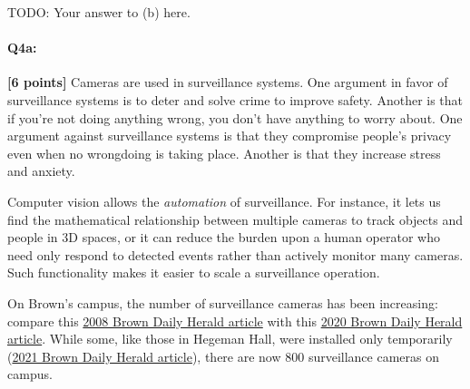 \begin{enumerate}[(a)]
\begin{enumerate} [(a)]
\begin{tcolorbox}[colback=white!5!white,colframe=green!75!black]
{{    TODO: Your answer to (b) here.

    }}
\end{tcolorbox}

\end{enumerate}

\end{enumerate}







\pagebreak 
\paragraph{Q4a:} \textbf{[6 points]} Cameras are used in surveillance systems. One argument in favor of surveillance systems is to deter and solve crime to improve safety. Another is that if you're not doing anything wrong, you don't have anything to worry about. One argument against surveillance systems is that they compromise people's privacy even when no wrongdoing is taking place. Another is that they increase stress and anxiety.

Computer vision allows the \emph{automation} of surveillance. For instance, it lets us find the mathematical relationship between multiple cameras to track objects and people in 3D spaces, or it can reduce the burden upon a human operator who need only respond to detected events rather than actively monitor many cameras. Such functionality makes it easier to scale a surveillance operation.

On Brown's campus, the number of surveillance cameras has been increasing: compare this \href{https://www.browndailyherald.com/2008/01/10/surveillance-cameras-on-campus-triple/}{2008 Brown Daily Herald article} with this \href{https://www.browndailyherald.com/2020/02/21/cameras-installed-hegeman-hall/}{2020 Brown Daily Herald article}. While some, like those in Hegeman Hall, were installed only temporarily (\href{https://www.browndailyherald.com/article/2021/07/university-removes-hegeman-hall-surveillance-cameras}{2021 Brown Daily Herald article}), there are now 800 surveillance cameras on campus.

